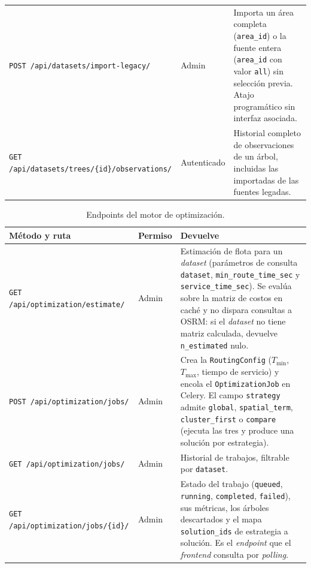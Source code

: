 \begin{table}[H]
\begin{tabularx}{\textwidth}{@{}p{5.5cm} p{1.9cm} X@{}}
    \texttt{POST \slash api\slash datasets\slash import-legacy\slash }        & Admin       & Importa un área completa (\texttt{area\_id}) o la fuente entera (\texttt{area\_id} con valor \texttt{all}) sin selección previa. Atajo programático sin interfaz asociada. \\
    \texttt{GET \slash api\slash datasets\slash trees\slash \{id\}\slash observations\slash } & Autenticado & Historial completo de observaciones de un árbol, incluidas las importadas de las fuentes legadas. \\
    \bottomrule
  \end{tabularx}
\end{table}

\begin{table}[H]
  \centering
  \caption{Endpoints del motor de optimización.}
  \label{tab:anexo_api_optimization}
  \small
  \begin{tabularx}{\textwidth}{@{}p{5.5cm} p{1.9cm} X@{}}
    \toprule
    Método y ruta & Permiso & Devuelve \\
    \midrule
    \texttt{GET \slash api\slash optimization\slash estimate\slash }                 & Admin       & Estimación de flota para un \textit{dataset} (parámetros de consulta \texttt{dataset}, \texttt{min\_route\_time\_sec} y \texttt{service\_time\_sec}). Se evalúa sobre la matriz de costos en caché y no dispara consultas a OSRM: si el \textit{dataset} no tiene matriz calculada, devuelve \texttt{n\_estimated} nulo. \\
    \texttt{POST \slash api\slash optimization\slash jobs\slash }                    & Admin       & Crea la \texttt{RoutingConfig} ($T_{\min}$, $T_{\max}$, tiempo de servicio) y encola el \texttt{OptimizationJob} en Celery. El campo \texttt{strategy} admite \texttt{global}, \texttt{spatial\_term}, \texttt{cluster\_first} o \texttt{compare} (ejecuta las tres y produce una solución por estrategia). \\
    \texttt{GET \slash api\slash optimization\slash jobs\slash }                     & Admin       & Historial de trabajos, filtrable por \texttt{dataset}. \\
    \texttt{GET \slash api\slash optimization\slash jobs\slash \{id\}\slash }              & Admin       & Estado del trabajo (\texttt{queued}, \texttt{running}, \texttt{completed}, \texttt{failed}), sus métricas, los árboles descartados y el mapa \texttt{solution\_ids} de estrategia a solución. Es el \textit{endpoint} que el \textit{frontend} consulta por \textit{polling}. \\

\end{tabularx}
\end{table}
